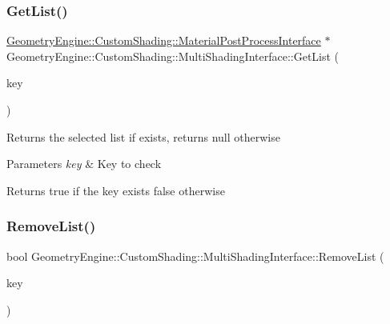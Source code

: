 \subsubsection{\texorpdfstring{GetList()}{GetList()}}
{\footnotesize\ttfamily \mbox{\hyperlink{class_geometry_engine_1_1_custom_shading_1_1_material_post_process_interface}{Geometry\+Engine\+::\+Custom\+Shading\+::\+Material\+Post\+Process\+Interface}} $\ast$ Geometry\+Engine\+::\+Custom\+Shading\+::\+Multi\+Shading\+Interface\+::\+Get\+List (\begin{DoxyParamCaption}\item[{\mbox{\hyperlink{namespace_geometry_engine_1_1_custom_shading_a9bfcbfb6d734e4d6fb8e2c661b987db6}{Shading\+Lists}}}]{key }\end{DoxyParamCaption})}

Returns the selected list if exists, returns null otherwise 
\begin{DoxyParams}{Parameters}
{\em key} & Key to check \\
\hline
\end{DoxyParams}
\begin{DoxyReturn}{Returns}
true if the key exists false otherwise 
\end{DoxyReturn}
\mbox{\label{class_geometry_engine_1_1_custom_shading_1_1_multi_shading_interface_ad9ff25635eb9eb23229027e988a99a4f}} 
\subsubsection{\texorpdfstring{RemoveList()}{RemoveList()}}
{\footnotesize\ttfamily bool Geometry\+Engine\+::\+Custom\+Shading\+::\+Multi\+Shading\+Interface\+::\+Remove\+List (\begin{DoxyParamCaption}\item[{\mbox{\hyperlink{namespace_geometry_engine_1_1_custom_shading_a9bfcbfb6d734e4d6fb8e2c661b987db6}{Shading\+Lists}}}]{key }\end{DoxyParamCaption})}

